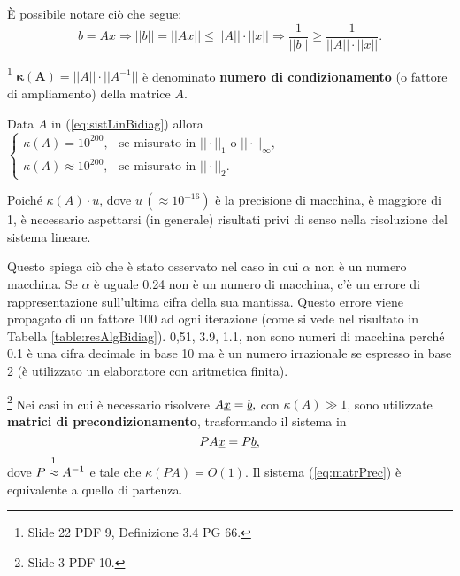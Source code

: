 È possibile notare ciò che segue:
\begin{equation*}
    b=Ax\Rightarrow ||b||=||Ax||\leq ||A||\cdot||x||\Rightarrow\frac{1}{||b||}\geq \frac{1}{||A||\cdot||x||}.
\end{equation*}

\begin{definition}\label{def:numero_condizionamento_matrice} \footnote{Slide 22 PDF 9, Definizione 3.4 PG 66.}
    $\boldsymbol{\kappa(A)}=||A||\cdot||A^{-1}||$ è denominato \textbf{numero di condizionamento} (o fattore di ampliamento) della matrice $A$.
\end{definition}

\begin{example}
    Data $A$ in (\ref{eq:sistLinBidiag}) allora
    $\begin{cases}
         \kappa(A) = 10^{200}, &\text{se misurato in }||\cdot||_1\text{ o }||\cdot||_\infty,\\
         \kappa(A)\approx 10^{200}, &\text{se misurato in }||\cdot||_2.
    \end{cases}$

    Poiché $\kappa(A)\cdot u$, dove $u\,(\approx 10^{-16})$ è la precisione di macchina, è maggiore di 1, è necessario aspettarsi (in generale) risultati privi di senso nella risoluzione del sistema lineare.
    
    Questo spiega ciò che è stato osservato nel caso in cui $\alpha$ non è un numero macchina. Se $\alpha$ è uguale 0.24 non è un numero di macchina, c'è un errore di rappresentazione sull'ultima cifra della sua mantissa. Questo errore viene propagato di un fattore 100 ad ogni iterazione (come si vede nel risultato in Tabella \ref{table:resAlgBidiag}). 0,51, 3.9, 1.1, non sono numeri di macchina perché 0.1 è una cifra decimale in base 10 ma è un numero irrazionale se espresso in base 2 (è utilizzato un elaboratore con aritmetica finita).
\end{example}

\begin{remark}\footnote{Slide 3 PDF 10.}
    Nei casi in cui è necessario risolvere $A\uline x = \uline b,$ con $\kappa(A)\gg1$, sono utilizzate \textbf{matrici di precondizionamento}, trasformando il sistema in
    \begin{equation}\label{eq:matrPrec}
        PA\uline x= P\uline b,
    \end{equation}
    dove $P\overset{\footnotemark}{\approx} A^{-1}$ e tale che $\kappa(PA)=O(1)$. Il sistema (\ref{eq:matrPrec}) è equivalente a quello di partenza.
\end{remark}

